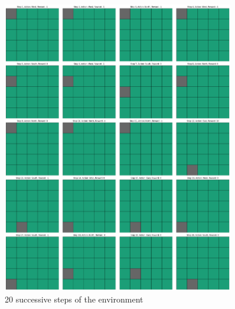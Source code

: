 \documentclass{article} %
\begin{document}
	\begin{figure}[h!]
		\centering
		\includegraphics[width=0.9\textwidth]{images/20_steps.png}
		\caption{20 successive steps of the environment}
		\label{fig:1.1.a.1}
	\end{figure}
	
	
\end{document}

